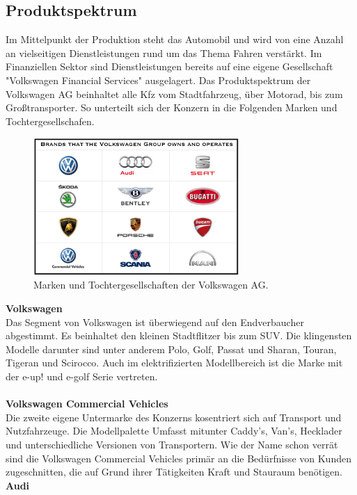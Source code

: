 \documentclass[12pt]{article}
\begin{document}
\newpage
\subsection{Produktspektrum}
Im Mittelpunkt der Produktion steht das Automobil und wird von eine Anzahl an vielseitigen Dienstleistungen rund um das Thema Fahren verstärkt. Im Finanziellen Sektor sind Dienstleistungen bereits auf eine eigene Gesellschaft "Volkswagen Financial Services" ausgelagert.
Das Produktspektrum der Volkswagen AG beinhaltet alle Kfz vom Stadtfahrzeug, über Motorad, bis zum Großtransporter.
So unterteilt sich der Konzern in die Folgenden Marken und Tochtergesellschafen.\\
\begin{figure}[!h]
\centering
\includegraphics[width=0.7\textwidth]{images/Volkswagen-Group-Brands}
\caption{Marken und Tochtergesellschaften der Volkswagen AG. \cite{marken}}
\end{figure}\FloatBarrier
\noindent
\textbf{Volkswagen}\\
Das Segment von Volkswagen ist überwiegend auf den Endverbaucher abgestimmt. Es beinhaltet den kleinen Stadtflitzer bis zum SUV. Die klingensten Modelle darunter sind unter anderem Polo, Golf, Passat und Sharan, Touran, Tigeran und Scirocco.
Auch im elektrifizierten Modellbereich ist die Marke mit der e-up! und e-golf Serie vertreten.\\
\\
\textbf{Volkswagen Commercial Vehicles}\\
Die zweite eigene Untermarke des Konzerns kosentriert sich auf Transport und Nutzfahrzeuge. Die Modellpalette Umfasst mitunter Caddy's, Van's, Hecklader und unterschiedliche Versionen von Transportern. Wie der Name schon verrät sind die Volkswagen Commercial Vehicles primär an die Bedürfnisse von Kunden zugeschnitten, die auf Grund ihrer Tätigkeiten Kraft und Stauraum benötigen.
\newpage
\textbf{Audi}\\
\end{document}
